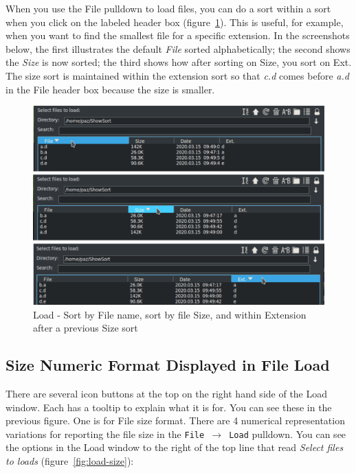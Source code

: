 When you use the File pulldown to load files, you can do a sort within a sort when you click on the labeled header box (figure~\ref{fig:load-sort}).  This is useful, for example, when you want to find the smallest file for a specific extension.   In the screenshots below, the first illustrates the default \textit{File} sorted alphabetically; the second shows the \textit{Size} is now sorted; the third shows how after sorting on Size, you sort on Ext.  The size sort is maintained within the extension sort so that \textit{c.d} comes before \textit{a.d} in the File header box because the size is smaller.

\begin{figure}[htpb]
    \centering
    \includegraphics[width=0.9\linewidth]{images/load-sort.png}
    \caption{Load - Sort by File name, sort by file Size, and within Extension after a previous Size sort}
    \label{fig:load-sort}
\end{figure}

\subsection{Size Numeric Format Displayed in File Load}%
\label{sub:size_numeric_format_displayed_file_load}

There are several icon buttons at the top on the right hand side of the Load window.  Each has a tooltip to explain what it is for.  You can see these in the previous figure.  One is for File size format.  There are 4 numerical representation variations for reporting the file size in the \texttt{File $\rightarrow$ Load} pulldown.    You can see the options in the Load window to the right of the top line that read \textit{Select files to loads} (figure~\ref{fig:load-size}):

